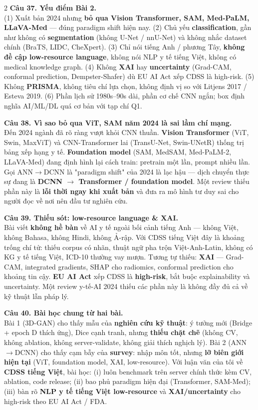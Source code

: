 \begin{paracol}{2}
\textbf{Câu 37. Yếu điểm Bài 2.}\\
(1) Xuất bản 2024 nhưng \textbf{bỏ qua Vision Transformer, SAM, Med-PaLM, LLaVA-Med} — đúng paradigm shift hiện nay. (2) Chủ yếu \textbf{classification}, gần như không có \textbf{segmentation} (không U-Net / nnU-Net) và không nhắc dataset chính (BraTS, LIDC, CheXpert). (3) Chỉ nói tiếng Anh / phương Tây, \textbf{không đề cập low-resource language}, không nói NLP y tế tiếng Việt, không có medical knowledge graph. (4) Không \textbf{XAI} hay \textbf{uncertainty} (Grad-CAM, conformal prediction, Dempster-Shafer) dù EU AI Act xếp CDSS là high-risk. (5) Không \textbf{PRISMA}, không tiêu chí lựa chọn, không định vị so với Litjens 2017 / Esteva 2019. (6) Phần lịch sử 1980s--90s dài, phần cơ chế CNN ngắn; box định nghĩa AI/ML/DL quá cơ bản với tạp chí Q1.

\textbf{Câu 38. Vì sao bỏ qua ViT, SAM năm 2024 là sai lầm chí mạng.}\\
Đến 2024 ngành đã rõ ràng vượt khỏi CNN thuần. \textbf{Vision Transformer} (ViT, Swin, MaxViT) và CNN-Transformer lai (TransU-Net, Swin-UNetR) thống trị bảng xếp hạng y tế. \textbf{Foundation model} (SAM, MedSAM, Med-PaLM-2, LLaVA-Med) đang định hình lại cách train: pretrain một lần, prompt nhiều lần. Gọi ANN$\to$DCNN là "paradigm shift" của 2024 là lạc hậu — dịch chuyển thực sự đang là \textbf{DCNN $\to$ Transformer / foundation model}. Một review thiếu phần này là \textbf{lỗi thời ngay khi xuất bản} và đưa ra mô hình tư duy sai cho người đọc về nơi nên đầu tư nghiên cứu.

\textbf{Câu 39. Thiếu sót: low-resource language \& XAI.}\\
Bài viết \textbf{không hề bàn} về AI y tế ngoài bối cảnh tiếng Anh — không Việt, không Bahasa, không Hindi, không Ả-rập. Với CDSS tiếng Việt đây là khoảng trống chí tử: thiếu corpus có nhãn, thuật ngữ pha trộn Việt-Anh-Latin, không có KG y tế tiếng Việt, ICD-10 thường vay mượn. Tương tự thiếu: \textbf{XAI} — Grad-CAM, integrated gradients, SHAP cho radiomics, conformal prediction cho khoảng tin cậy. \textbf{EU AI Act} xếp CDSS là \textbf{high-risk}, bắt buộc explainability và uncertainty. Một review y-tế-AI 2024 thiếu các phần này là không đầy đủ cả về kỹ thuật lẫn pháp lý.

\textbf{Câu 40. Bài học chung từ hai bài.}\\
Bài 1 (3D-GAN) cho thấy mẫu của \textbf{nghiên cứu kỹ thuật}: ý tưởng mới (Bridge + epoch D thích ứng), Dice cạnh tranh, nhưng \textbf{thiếu chặt chẽ} (không CV, không ablation, không server-validate, không giải thích nghịch lý). Bài 2 (ANN$\to$DCNN) cho thấy cạm bẫy của \textbf{survey}: nhập môn tốt, nhưng \textbf{lỡ biên giới hiện tại} (ViT, foundation model, XAI, low-resource). Với luận văn của tôi về \textbf{CDSS tiếng Việt}, bài học: (i) luôn benchmark trên server chính thức kèm CV, ablation, code release; (ii) bao phủ paradigm hiện đại (Transformer, SAM-Med); (iii) bàn rõ \textbf{NLP y tế tiếng Việt low-resource} và \textbf{XAI/uncertainty} cho high-risk theo EU AI Act / FDA.


\end{paracol}
